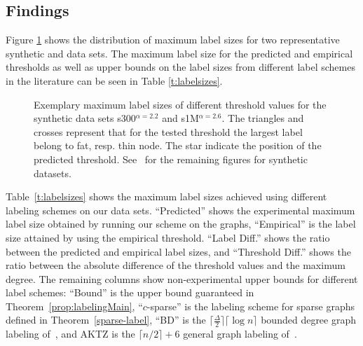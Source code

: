 \subsection{Findings}
Figure \ref{fig:findings} shows the distribution of maximum label sizes for two representative synthetic and  data sets. The maximum label size
for the predicted and empirical thresholds as well as upper bounds on the label sizes from different label schemes in the literature can be seen in Table \ref{t:labelsizes}. 

\begin{figure}[!ht]
\centering
{}\hspace*{-2.5em}
%
\caption{Exemplary maximum label sizes of different threshold values for the synthetic data sets   s300$^{\alpha=2.2}$ and s1M$^{\alpha=2.6}$. 
The triangles and crosses represent that for the tested threshold the largest label belong to fat, resp. thin node. The star indicate the position of the predicted threshold.
See~\cite{} for the remaining  figures for synthetic datasets.}
\label{fig:findings}%
\end{figure}




Table~\ref{t:labelsizes}  shows  the maximum label sizes achieved using different labeling schemes on our data sets. ``Predicted'' shows the experimental maximum label size obtained by running our scheme on the graphs, ``Empirical'' is the label size attained by using the empirical threshold.
``Label Diff.'' shows the ratio between the predicted and empirical label sizes, and  ``Threshold Diff.'' shows the ratio between the absolute difference of the threshold values and the maximum degree.
 The remaining columns show non-experimental upper bounds for different label schemes: ``Bound'' is the upper bound guaranteed in Theorem~\ref{prop:labelingMain}, ``$c$-sparse'' is  the labeling scheme for sparse graphs defined in Theorem~\ref{sparse-label}, ``BD'' is the $\lceil \frac{\Delta}{2} \rceil \lceil \log n\rceil$ bounded degree graph  labeling of~\cite{adjiashvili2014labeling}, and AKTZ is the $\lceil n/2\rceil+6$ general graph  labeling of~\cite{alstrup2014adjacency}.
 
